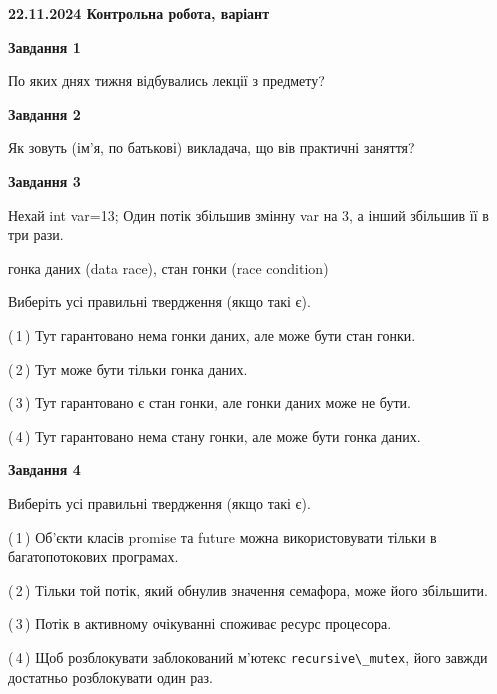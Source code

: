 \documentclass[12pt, ukrainian]{article}
\def\code#1{\Verb!#1!}
\begin{document}
\begin {large}

\textbf{22.11.2024 Контрольна робота, варіант  }\par


{

\begin{center}
\textbf{Завдання 1}
\end{center}

По яких днях тижня відбувались лекції з предмету?


\begin{center}
\textbf{Завдання 2}
\end{center}

Як зовуть (ім'я, по батькові) викладача, що вів практичні заняття?


\begin{center}
\textbf{Завдання 3}
\end{center}

Нехай int var=13; Один потік збільшив змінну var на 3, а інший збільшив її в три рази.

гонка даних (data race), стан гонки (race condition)

Виберіть усі правильні твердження (якщо такі є).\par
\vspace{2mm}
(\,1\,) Тут гарантовано нема гонки даних, але може бути стан гонки.%

(\,2\,) Тут може бути тільки гонка даних.%

(\,3\,) Тут гарантовано є стан гонки, але гонки даних може не бути.%

(\,4\,) Тут гарантовано нема стану гонки, але може бути гонка даних.%


\begin{center}
\textbf{Завдання 4}
\end{center}

Виберіть усі правильні твердження (якщо такі є).\par
\vspace{2mm}

(\,1\,) Об’єкти класів promise та future можна використовувати тільки в багатопотокових програмах.%

(\,2\,) Тільки той потік, який обнулив значення семафора, може його збільшити.%

(\,3\,) Потік в активному очікуванні споживає ресурс процесора.%

(\,4\,) Щоб розблокувати заблокований м’ютекс \code{recursive\_mutex}, його завжди достатньо розблокувати один раз.%


}
\end{large}
\end{document}
